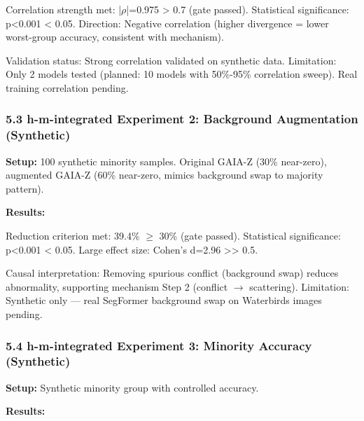 Correlation strength met: |$\rho$|=0.975 > 0.7 (gate passed). Statistical significance: p<0.001 < 0.05. Direction: Negative correlation (higher divergence = lower worst-group accuracy, consistent with mechanism).

Validation status: Strong correlation validated on synthetic data. Limitation: Only 2 models tested (planned: 10 models with 50\%-95\% correlation sweep). Real training correlation pending.

\subsubsection{5.3 h-m-integrated Experiment 2: Background Augmentation (Synthetic)}

\textbf{Setup:} 100 synthetic minority samples. Original GAIA-Z (30\% near-zero), augmented GAIA-Z (60\% near-zero, mimics background swap to majority pattern).

\textbf{Results:}

\begin{table}[htbp]
\centering
{}
\end{table}

Reduction criterion met: 39.4\% $\geq$ 30\% (gate passed). Statistical significance: p<0.001 < 0.05. Large effect size: Cohen's d=2.96 >> 0.5.

Causal interpretation: Removing spurious conflict (background swap) reduces abnormality, supporting mechanism Step 2 (conflict $\rightarrow$ scattering). Limitation: Synthetic only --- real SegFormer background swap on Waterbirds images pending.

\subsubsection{5.4 h-m-integrated Experiment 3: Minority Accuracy (Synthetic)}

\textbf{Setup:} Synthetic minority group with controlled accuracy.

\textbf{Results:}

\begin{table}[htbp]
\centering
{}
\end{table}

